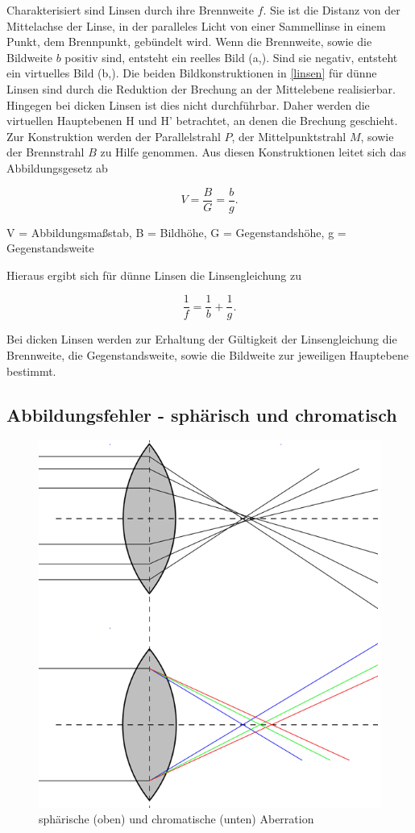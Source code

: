 Charakterisiert sind Linsen durch ihre Brennweite $f$. Sie ist die Distanz von der Mittelachse der Linse, in der paralleles Licht von
einer Sammellinse in einem Punkt, dem Brennpunkt, gebündelt wird. Wenn die Brennweite, sowie die Bildweite $b$ positiv sind, entsteht
ein reelles Bild (a,). Sind sie negativ, entsteht ein virtuelles Bild (b,). Die beiden Bildkonstruktionen in \ref{linsen} für dünne
Linsen sind durch die Reduktion der Brechung an der Mittelebene realisierbar. Hingegen bei dicken Linsen ist dies nicht durchführbar.
Daher werden die virtuellen Hauptebenen H und H' betrachtet, an denen die Brechung geschieht. Zur Konstruktion werden der Parallelstrahl $P$, der
Mittelpunktstrahl $M$, sowie der Brennstrahl $B$ zu Hilfe genommen. Aus diesen Konstruktionen leitet sich das Abbildungsgesetz ab

\begin{formel}
 \begin{equation}
  V = \frac{B}{G} = \frac{b}{g}.
  \label{Abbildung}
 \end{equation}
 \caption*{\small{V = Abbildungsmaßstab, B = Bildhöhe, G = Gegenstandshöhe, g = Gegenstandsweite}}
\end{formel}

Hieraus ergibt sich für dünne Linsen die Linsengleichung zu

\begin{equation}
 \frac1f = \frac1b + \frac1g.
 \label{Linsengleichung}
\end{equation}

Bei dicken Linsen werden zur Erhaltung der Gültigkeit der Linsengleichung die Brennweite, die Gegenstandsweite, sowie die Bildweite 
zur jeweiligen Hauptebene bestimmt. 

\subsection{Abbildungsfehler - sphärisch und chromatisch}

\begin{figure}
\includegraphics[width = 0.5 \textwidth]{pics/408b.png}  
\caption{sphärische (oben) und chromatische (unten) Aberration}
\end{figure}


